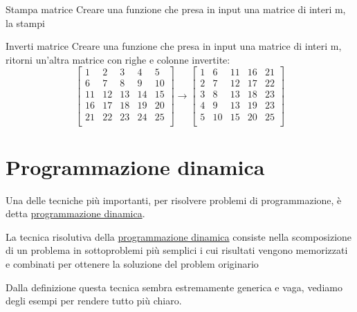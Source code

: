 \begin{esercizio}{Stampa matrice}
	Creare una funzione che presa in input una matrice di interi {\ttfamily m}, la stampi
\end{esercizio}

\begin{esercizio}{Inverti matrice}
	Creare una funzione che presa in input una matrice di interi {\ttfamily m}, ritorni un'altra matrice con righe e colonne invertite:
	\[
		\begin{bmatrix}
			1  & 2  & 3  & 4  & 5  \\
			6  & 7  & 8  & 9  & 10 \\
			11 & 12 & 13 & 14 & 15 \\
			16 & 17 & 18 & 19 & 20 \\
			21 & 22 & 23 & 24 & 25 \\
		\end{bmatrix}
		\rightarrow
		\begin{bmatrix}
			1 & 6  & 11 & 16 & 21 \\
			2 & 7  & 12 & 17 & 22 \\
			3 & 8  & 13 & 18 & 23 \\
			4 & 9  & 13 & 19 & 23 \\
			5 & 10 & 15 & 20 & 25 \\
		\end{bmatrix}
	\]

\end{esercizio}

\section{Programmazione dinamica}
Una delle tecniche più importanti, per risolvere problemi di programmazione, è detta \underline{programmazione dinamica}.
\vskip3mm
\begin{tcolorbox}
	La tecnica risolutiva della \underline{programmazione dinamica} consiste nella scomposizione di un problema in sottoproblemi più semplici i cui risultati vengono memorizzati e combinati per ottenere la soluzione del problem originario
\end{tcolorbox}

\vskip3mm
Dalla definizione questa tecnica sembra estremamente generica e vaga, vediamo degli esempi per rendere tutto più chiaro.
